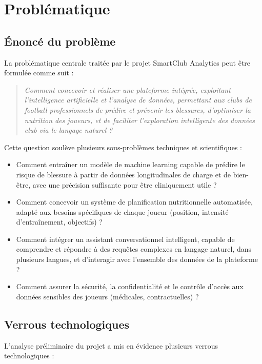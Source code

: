 \section{Problématique}

\subsection{Énoncé du problème}

La problématique centrale traitée par le projet SmartClub Analytics peut être formulée comme suit :

\begin{quote}
\textit{Comment concevoir et réaliser une plateforme intégrée, exploitant l'intelligence artificielle et l'analyse de données, permettant aux clubs de football professionnels de prédire et prévenir les blessures, d'optimiser la nutrition des joueurs, et de faciliter l'exploration intelligente des données club via le langage naturel ?}
\end{quote}

Cette question soulève plusieurs sous-problèmes techniques et scientifiques :

\begin{itemize}
    \item Comment entraîner un modèle de machine learning capable de prédire le risque de blessure à partir de données longitudinales de charge et de bien-être, avec une précision suffisante pour être cliniquement utile ?
    \item Comment concevoir un système de planification nutritionnelle automatisée, adapté aux besoins spécifiques de chaque joueur (position, intensité d'entraînement, objectifs) ?
    \item Comment intégrer un assistant conversationnel intelligent, capable de comprendre et répondre à des requêtes complexes en langage naturel, dans plusieurs langues, et d'interagir avec l'ensemble des données de la plateforme ?
    \item Comment assurer la sécurité, la confidentialité et le contrôle d'accès aux données sensibles des joueurs (médicales, contractuelles) ?
\end{itemize}

\subsection{Verrous technologiques}

L'analyse préliminaire du projet a mis en évidence plusieurs verrous technologiques :

